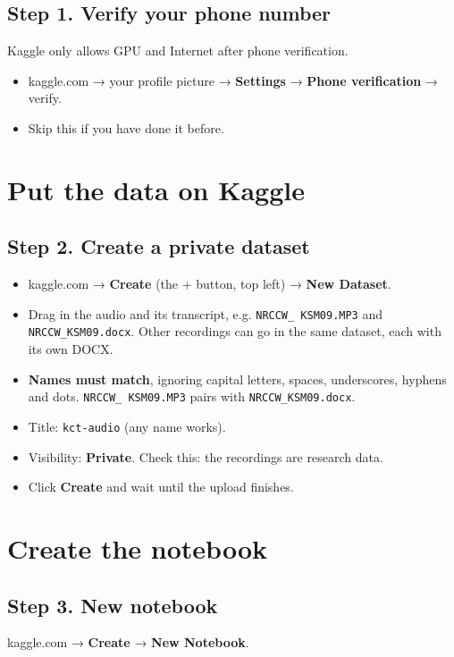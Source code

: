 \documentclass[11pt]{article}
\begin{document}
\subsection*{Step 1. Verify your phone number}
Kaggle only allows GPU and Internet after phone verification.
\begin{itemize}
\item kaggle.com → your profile picture → \textbf{Settings} → \textbf{Phone verification} → verify.
\item Skip this if you have done it before.
\end{itemize}

\section{Put the data on Kaggle}\label{data}

\subsection*{Step 2. Create a private dataset}
\begin{itemize}
\item kaggle.com → \textbf{Create} (the + button, top left) → \textbf{New Dataset}.
\item Drag in the audio and its transcript, e.g. \texttt{NRCCW\_ KSM09.MP3} and \texttt{NRCCW\_KSM09.docx}. Other recordings can go in the same dataset, each with its own DOCX.
\item \textbf{Names must match}, ignoring capital letters, spaces, underscores, hyphens and dots. \texttt{NRCCW\_ KSM09.MP3} pairs with \texttt{NRCCW\_KSM09.docx}.
\item Title: \texttt{kct-audio} (any name works).
\item Visibility: \textbf{Private}. Check this: the recordings are research data.
\item Click \textbf{Create} and wait until the upload finishes.
\end{itemize}

\section{Create the notebook}\label{notebook}

\subsection*{Step 3. New notebook}
kaggle.com → \textbf{Create} → \textbf{New Notebook}.
\end{document}
